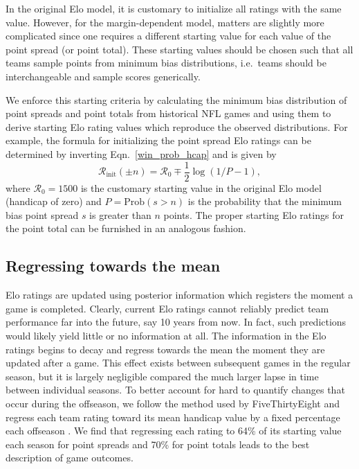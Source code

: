 \documentclass[aps,prc,reprint,amsmath,superscriptaddress]{revtex4-1}
\begin{document}
In the original Elo model, it is customary to initialize all ratings with the same value. 
However, for the margin-dependent model, matters are slightly more complicated since one requires a different starting value for each value of the point spread (or point total).
These starting values should be chosen such that all teams sample points from minimum bias distributions, i.e.\ teams should be interchangeable and sample scores generically.

We enforce this starting criteria by calculating the minimum bias distribution of point spreads and point totals from historical NFL games and using them to derive starting Elo rating values which reproduce the observed distributions.
For example, the formula for initializing the point spread Elo ratings can be determined by inverting Eqn.~\eqref{win_prob_hcap} and is given by
\begin{equation}
  \mathcal{R}_\text{init}(\pm n) = \mathcal{R}_0 \mp \frac{1}{2} \log\left(1/P - 1 \right),
\end{equation}
where $\mathcal{R}_0 = 1500$ is the customary starting value in the original Elo model (handicap of zero) and ${P=\mathrm{Prob}(s > n)}$ is the probability that the minimum bias point spread $s$ is greater than $n$ points.
The proper starting Elo ratings for the point total can be furnished in an analogous fashion.

\subsection{Regressing towards the mean}

Elo ratings are updated using posterior information which registers the moment a game is completed.
Clearly, current Elo ratings cannot reliably predict team performance far into the future, say 10 years from now.
In fact, such predictions would likely yield little or no information at all.
The information in the Elo ratings begins to decay and regress towards the mean the moment they are updated after a game.
This effect exists between subsequent games in the regular season, but it is largely negligible compared the much larger lapse in time between individual seasons.
To better account for hard to quantify changes that occur during the offseason, we follow the method used by FiveThirtyEight and regress each team rating toward its mean handicap value by a fixed percentage each offseason \cite{538NFL, 538NBA}.
We find that regressing each rating to 64\% of its starting value each season for point spreads and 70\% for point totals leads to the best description of game outcomes.
\end{document}
